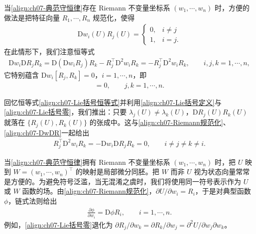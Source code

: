 \documentclass[../../main.tex]{subfiles}
\begin{document}
当\eqref{align:ch07-典范守恒律}存在 Riemann 不变量坐标系 $(w_1,\cdots,w_n)$ 时，方便的做法是把特征向量 $R_1,\cdots,R_n$ 规范化，使得
\begin{align}
\mathrm{D}w_i(U)R_j(U)=
\begin{cases}
0,& i\neq j\\
1,& i=j.
\end{cases}
\label{align:ch07-Riemann规范化}
\end{align}
在此情形下，我们注意恒等式
\begin{align}
\mathrm{D}w_i\mathrm{D}R_j R_k=\mathrm{D}(\mathrm{D}w_i R_j)R_k-R_j^\top\mathrm{D}^2 w_i R_k=-R_j^\top\mathrm{D}^2 w_i R_k,\qquad i,j,k=1,\cdots,n,
\label{align:ch07-DwDR}
\end{align}
它特别蕴含 $\mathrm{D}w_i[R_j,R_k]=0$，$i=1,\cdots,n$，即
\begin{align}
[R_j,R_k]=0,\qquad j,k=1,\cdots,n.
\label{align:ch07-Lie括号零}
\end{align}

回忆恒等式\eqref{align:ch07-Lie括号恒等式}并利用\eqref{align:ch07-Lie括号定义}与\eqref{align:ch07-Lie括号零}，我们推出：只要 $\lambda_j(U)\neq\lambda_k(U)$，$\mathrm{D}R_j(U)R_k(U)$ 就落在 $\{R_j(U),R_k(U)\}$ 的张成中。这与\eqref{align:ch07-Riemann规范化}、\eqref{align:ch07-DwDR}一起给出
\begin{align}
R_j^\top\mathrm{D}^2 w_i R_k=-\mathrm{D}w_i\mathrm{D}R_j R_k=0,\qquad i\neq j\neq k\neq i.
\label{align:ch07-D2w交叉}
\end{align}

当\eqref{align:ch07-典范守恒律}拥有 Riemann 不变量坐标系 $(w_1,\cdots,w_n)$ 时，把 $U$ 映到 $W=(w_1,\cdots,w_n)^\top$ 的映射是局部微分同胚。把 $W$ 而非 $U$ 视为状态向量常常是方便的。为避免符号泛滥，当无混淆之虞时，我们将使用同一符号表示作为 $U$ 或 $W$ 函数的场。由\eqref{align:ch07-Riemann规范化}，$\partial U/\partial w_i=R_i$，于是对典型函数 $\phi$，链式法则给出
\begin{align}
\frac{\partial\phi}{\partial w_i}=\mathrm{D}\phi R_i,\qquad i=1,\cdots,n.
\label{align:ch07-链式法则}
\end{align}
例如，\eqref{align:ch07-Lie括号零}退化为 $\partial R_j/\partial w_k=\partial R_k/\partial w_j=\partial^2 U/\partial w_j\partial w_k$。
\end{document}
